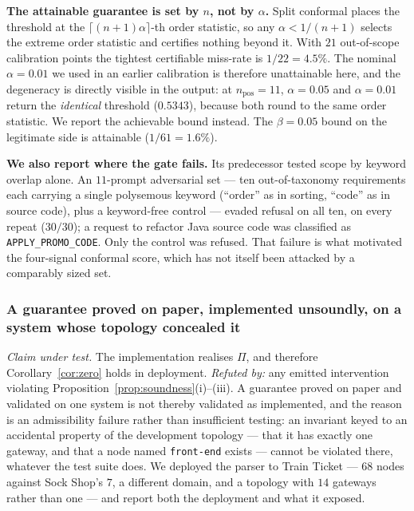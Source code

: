 \documentclass[journal, 10pt]{IEEEtran}
\begin{document}
\textbf{The attainable guarantee is set by $n$, not by $\alpha$.} Split conformal
places the threshold at the $\lceil (n{+}1)\alpha \rceil$-th order statistic, so
any $\alpha < 1/(n{+}1)$ selects the extreme order statistic and certifies
nothing beyond it. With $21$ out-of-scope calibration points the tightest
certifiable miss-rate is $1/22 = 4.5\%$. The nominal $\alpha = 0.01$ we used in
an earlier calibration is therefore unattainable here, and the degeneracy is
directly visible in the output: at $n_{\text{pos}}=11$, $\alpha = 0.05$ and
$\alpha = 0.01$ return the \emph{identical} threshold ($0.5343$), because both
round to the same order statistic. We report the achievable bound instead. The
$\beta = 0.05$ bound on the legitimate side is attainable ($1/61 = 1.6\%$).

\textbf{We also report where the gate fails.} Its predecessor tested scope by
keyword overlap alone. An $11$-prompt adversarial set --- ten out-of-taxonomy
requirements each carrying a single polysemous keyword (``order'' as in sorting,
``code'' as in source code), plus a keyword-free control --- evaded refusal on
all ten, on every repeat ($30/30$); a request to refactor Java source code was
classified as \texttt{APPLY\_PROMO\_CODE}. Only the control was refused. That
failure is what motivated the four-signal conformal score, which has not itself
been attacked by a comparably sized set.

\subsubsection{A guarantee proved on paper, implemented unsoundly, on a system whose topology concealed it}
\label{sec:rq3}

\emph{Claim under test.} The implementation realises $\Pi$, and therefore
Corollary~\ref{cor:zero} holds in deployment. \emph{Refuted by:} any emitted
intervention violating Proposition~\ref{prop:soundness}(i)--(iii). A guarantee
proved on paper and validated on one system is not thereby validated as
implemented, and the reason is an admissibility failure rather than insufficient
testing: an invariant keyed to an accidental property of the development topology
--- that it has exactly one gateway, and that a node named \texttt{front-end}
exists --- cannot be violated there, whatever the test suite does.
We deployed the parser to Train Ticket --- $68$ nodes against
Sock Shop's $7$, a different domain, and a topology with $14$ gateways rather
than one --- and report both the deployment and what it exposed.
\end{document}
